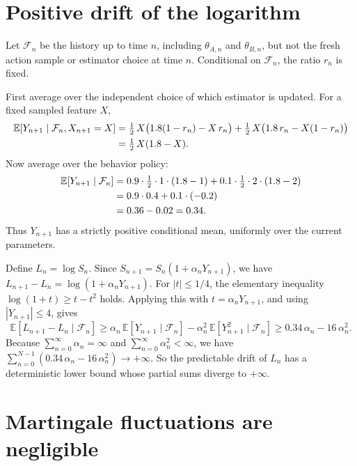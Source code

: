 \documentclass[11pt]{article}
\begin{document}
\section{Positive drift of the logarithm}

Let $\mathcal{F}_n$ be the history up to time $n$, including $\theta_{A,n}$ and $\theta_{B,n}$, but not the fresh action sample or estimator choice at time $n$. Conditional on $\mathcal{F}_n$, the ratio $r_n$ is fixed.

First average over the independent choice of which estimator is updated. For a fixed sampled feature $X$,
\begin{align}
\mathbb{E}[Y_{n+1} \mid \mathcal{F}_n, X_{n+1} = X]
&= \tfrac{1}{2}\, X\bigl(1.8(1 - r_n) - X\,r_n\bigr)
 + \tfrac{1}{2}\, X\bigl(1.8\,r_n - X(1 - r_n)\bigr) \notag \\
&= \tfrac{1}{2}\, X(1.8 - X). \label{eq:cond-mean-x}
\end{align}
Now average over the behavior policy:
\begin{align}
\mathbb{E}[Y_{n+1} \mid \mathcal{F}_n]
&= 0.9 \cdot \tfrac{1}{2} \cdot 1 \cdot (1.8 - 1)
 + 0.1 \cdot \tfrac{1}{2} \cdot 2 \cdot (1.8 - 2) \notag \\
&= 0.9 \cdot 0.4 + 0.1 \cdot (-0.2) \notag \\
&= 0.36 - 0.02 = 0.34. \label{eq:drift}
\end{align}
Thus $Y_{n+1}$ has a strictly positive conditional mean, uniformly over the current parameters.

Define $L_n = \log S_n$. Since $S_{n+1} = S_n(1 + \alpha_n Y_{n+1})$, we have $L_{n+1} - L_n = \log(1 + \alpha_n Y_{n+1})$. For $|t| \leq 1/4$, the elementary inequality $\log(1 + t) \geq t - t^2$ holds. Applying this with $t = \alpha_n Y_{n+1}$, and using $|Y_{n+1}| \leq 4$, gives
\begin{equation}\label{eq:log-drift-bound}
\mathbb{E}[L_{n+1} - L_n \mid \mathcal{F}_n]
\geq \alpha_n\,\mathbb{E}[Y_{n+1} \mid \mathcal{F}_n] - \alpha_n^2\,\mathbb{E}[Y_{n+1}^2 \mid \mathcal{F}_n]
\geq 0.34\,\alpha_n - 16\,\alpha_n^2.
\end{equation}
Because $\sum_{n=0}^{\infty} \alpha_n = \infty$ and $\sum_{n=0}^{\infty} \alpha_n^2 < \infty$, we have $\sum_{n=0}^{N-1}(0.34\,\alpha_n - 16\,\alpha_n^2) \to +\infty$. So the predictable drift of $L_n$ has a deterministic lower bound whose partial sums diverge to $+\infty$.

\section{Martingale fluctuations are negligible}
\end{document}
